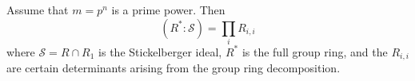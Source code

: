 Assume that $m = p^n$ is a prime power. Then
$$
(R^* : \mathcal{S}) = \prod_{i} R_{i,i}
$$
where $\mathcal{S} = R \cap R_1$ is the Stickelberger ideal, $R^*$ is the full group ring, and the $R_{i,i}$ are certain determinants arising from the group ring decomposition.
